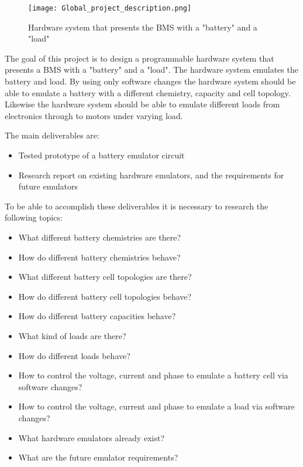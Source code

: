 \begin{figure}[ht]
    \centering
    \texttt{[image: Global\_project\_description.png]}
    \caption{Hardware system that presents the BMS with a "battery" and a "load"}
    \label{fig:global_project_description}
\end{figure}

The goal of this project is to design a programmable hardware system that presents a BMS with a "battery" and a "load". The hardware system emulates the battery and load. By using only software changes the hardware system should be able to emulate a battery with a different chemistry, capacity and cell topology. Likewise the hardware system should be able to emulate different loads from electronics through to motors under varying load.



The main deliverables are:
\begin{itemize}
    \item Tested prototype of a battery emulator circuit
    \item Research report on existing hardware emulators, and the requirements for future emulators
\end{itemize}

To be able to accomplish these deliverables it is necessary to research the following topics:
\begin{itemize}
    \item What different battery chemistries are there?
    \item How do different battery chemistries behave?
    \item What different battery cell topologies are there?
    \item How do different battery cell topologies behave?
    \item How do different battery capacities behave?
    \item What kind of loads are there?
    \item How do different loads behave?
    \item How to control the voltage, current and phase to emulate a battery cell via software changes?
    \item How to control the voltage, current and phase to emulate a load via software changes?
    \item What hardware emulators already exist?
    \item What are the future emulator requirements?
\end{itemize}

